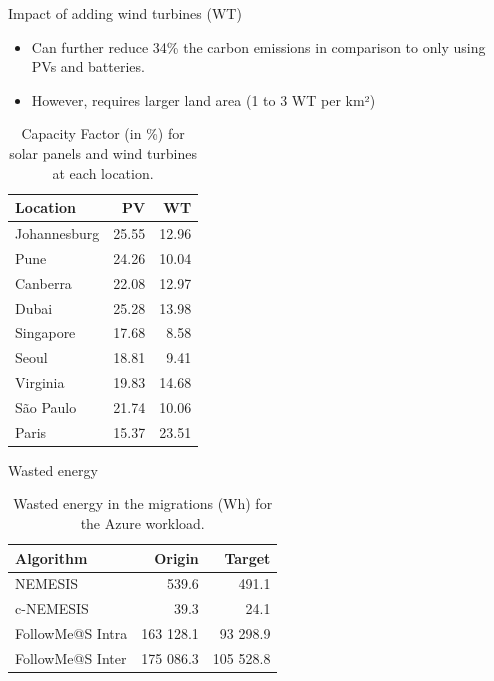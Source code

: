 \documentclass[Ligatures=TeX,table,svgnames,usetotalslideindicator,compress,10pt,aspectratio=169]{beamer}
\begin{document}
\begin{frame}{Impact of adding wind turbines (WT) }
    

  \begin{itemize}    
     \item  Can further reduce 34\% the carbon emissions in comparison to only using PVs and batteries.
     \item However, requires larger land area (1 to 3 WT per km²)
  \end{itemize}
\begin{table}[H]
  
  \caption{Capacity Factor (in \%) for solar panels and wind turbines at each location.}\label{tab:capacity_factor} \centering
  
  \begin{tabular}{|l|r|r|}
  \hline    
  \textbf{Location} &   \textbf{PV} & \textbf{WT}  \\
  \hline
  Johannesburg & 25.55 & 12.96  \\
  \hline
  Pune        &  24.26   & 10.04    \\
  \hline
  Canberra    & 22.08    & 12.97  \\
  \hline
  Dubai      & 25.28      & 13.98   \\
  \hline
  Singapore & 17.68    & 8.58   \\
  \hline     
  Seoul      & 18.81   &  9.41   \\
  \hline
  Virginia   & 19.83   &  14.68 \\
  \hline
  São Paulo  & 21.74   &  10.06    \\
  \hline 
  Paris      & 15.37   &  23.51   \\
  \hline  

\end{tabular}
\end{table}
  
\end{frame}

\begin{frame}{Wasted energy}  
  \begin{table}[!ht]

    \caption{Wasted energy in the migrations (Wh) for the Azure workload.}\label{tab:wasted_mig} \centering
    \begin{tabular}{|l|r|r|}
      \hline
      \textbf{Algorithm}  & \textbf{Origin} & \textbf{Target}   \\
      \hline
      NEMESIS   & 539.6  & 491.1 \\
      \hline
      c-NEMESIS &  39.3 & 24.1  \\
      \hline
      FollowMe@S Intra & 163 128.1  & 93 298.9  \\
      \hline
      FollowMe@S Inter & 175 086.3  & 105 528.8 \\
      \hline
    \end{tabular}
  \end{table} 
\end{frame}
\end{document}
